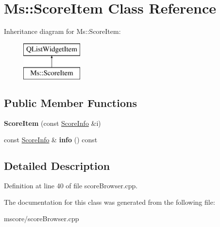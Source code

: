 \hypertarget{class_ms_1_1_score_item}{}\section{Ms\+:\+:Score\+Item Class Reference}
\label{class_ms_1_1_score_item}
Inheritance diagram for Ms\+:\+:Score\+Item\+:\begin{figure}[H]
\begin{center}
\leavevmode
\includegraphics[height=2.000000cm]{class_ms_1_1_score_item}
\end{center}
\end{figure}
\subsection*{Public Member Functions}
\begin{DoxyCompactItemize}
\item 
\mbox{\label{class_ms_1_1_score_item_a69d1b5bbf68d23357359648a0af807fa}} 
{\bfseries Score\+Item} (const \hyperlink{class_ms_1_1_score_info}{Score\+Info} \&i)
\item 
\mbox{\label{class_ms_1_1_score_item_a7c23a3ca6cdb9743d9bdb1bc55b6ca7c}} 
const \hyperlink{class_ms_1_1_score_info}{Score\+Info} \& {\bfseries info} () const
\end{DoxyCompactItemize}


\subsection{Detailed Description}


Definition at line 40 of file score\+Browser.\+cpp.



The documentation for this class was generated from the following file\+:\begin{DoxyCompactItemize}
\item 
mscore/score\+Browser.\+cpp\end{DoxyCompactItemize}
